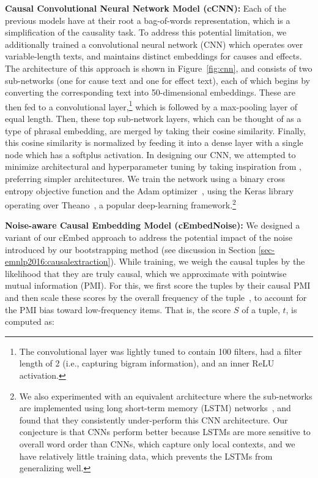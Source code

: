 {\flushleft \textbf{Causal Convolutional Neural Network Model (cCNN):}}
Each of the previous models have at their root a bag-of-words representation, which is a simplification of the causality task. To address this potential limitation, we additionally trained a convolutional neural network (CNN) which operates over variable-length texts, and maintains distinct embeddings for causes and effects.  The architecture of this approach is shown in Figure~\ref{fig:cnn}, and consists of two sub-networks (one for cause text and one for effect text), each of which begins by converting the corresponding text into 50-dimensional embeddings.  These are then fed to a convolutional layer,\footnote{The convolutional layer was lightly tuned to contain 100 filters, had a filter length of 2 (i.e., capturing bigram information), and an inner ReLU activation.} which is followed by a max-pooling layer of equal length.
Then, these top sub-network layers, which can be thought of as a type of phrasal embedding, are merged by taking their cosine similarity.  Finally, this cosine similarity is normalized by feeding it into a dense layer with a single node which has a softplus activation.  
In designing our CNN, we attempted to minimize architectural and hyperparameter tuning by taking inspiration from \citet{iyyer2015deep}, preferring simpler architectures.
We train the network using a binary cross entropy objective function and the Adam optimizer~\citep{kingma2014adam}, using the Keras library~\citep{chollet2015keras} operating over Theano~\citep{2016arXiv160502688short}, a popular deep-learning framework.\footnote{We also experimented with an equivalent architecture where the sub-networks are implemented using long short-term memory (LSTM) networks~\citep{hochreiter1997long}, and found that they consistently under-perform this CNN architecture. Our conjecture is that CNNs perform better because LSTMs are more sensitive to overall word order than CNNs, which capture only local contexts, and we have relatively little training data, which prevents the LSTMs from generalizing well.}

{\flushleft \textbf{Noise-aware Causal Embedding Model (cEmbedNoise):}} 
We designed a variant of our cEmbed approach to address the potential impact of the noise introduced by our bootstrapping method (see discussion in Section \ref{sec-emnlp2016:causalextraction}).
While training, we weigh the causal tuples by the likelihood that they are truly causal, which we approximate with pointwise mutual information (PMI).
For this, we first score the tuples by their causal PMI and then scale these scores by the overall frequency of the tuple~\citep{riloff1996automatically}, to account for the PMI bias toward low-frequency items.  That is, the score $S$ of a tuple, $t$, is computed as: 

